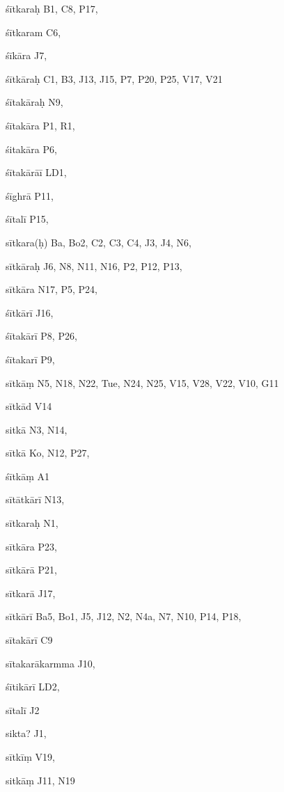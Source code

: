 \begin{ekdosis}
\begin{marma}[hp01_055]
\begin{marma}[hp02_009]
\begin{marma}[hp02_011]
\begin{marma}[hp02_55ab]
  \begin{description}

    \end{description}
 \end{marma}

 \begin{marma}[hp02_54a]
\item[śītkaraḥ] B1, C8, P17, 
\item[śītkaram] C6,
\item[śīkāra] J7,
\item[śītkāraḥ] C1, B3, J13, J15, P7, P20, P25, V17, V21 
\item[śītakāraḥ] N9, 
\item[śītakāra] P1, R1, 
\item[śitakāra] P6, 
\item[śītakārāī] LD1, 
\item[śīghrā] P11,
\item[śītalī] P15,  
\item[sītkara(ḥ)] Ba, Bo2, C2, C3, C4, J3, J4, N6, 
\item[sītkāraḥ] J6, N8, N11, N16, P2, P12, P13, 
\item[sītkāra] N17, P5, P24, 
\item[śītkārī] J16, 
\item[śītakārī] P8, P26, 
\item[śītakarī] P9,
\item[sītkāṃ] N5, N18, N22, Tue, N24, N25, V15, V28, V22, V10, G11
\item[sītkād] V14
\item[sitkā] N3, N14, 
\item[sītkā] Ko, N12, P27, 
\item[śītkāṃ] A1
\item[sītātkārī] N13,
\item[sītkaraḥ] N1,
\item[sītkāra] P23,
\item[sītkārā] P21,
\item[sītkarā] J17, 
\item[sītkārī] Ba5, Bo1, J5, J12, N2, N4a, N7, N10, P14, P18,    
\item[sītakārī] C9
\item[sītakarākarmma] J10, 
\item[śītikārī] LD2,
\item[sītalī] J2
\item[sikta?] J1,
\item[sītkīṃ] V19,
\item[sitkāṃ] J11, N19

\end{marma}
\end{marma}
\end{marma}
\end{marma}
\end{ekdosis}
